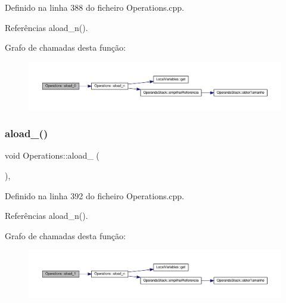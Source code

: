 Definido na linha 388 do ficheiro Operations.\+cpp.



Referências aload\+\_\+n().

Grafo de chamadas desta função\+:\nopagebreak
\begin{figure}[H]
\begin{center}
\leavevmode
\includegraphics[width=350pt]{classOperations_a9d821a16ef0681755717e8c4f740f6d0_cgraph}
\end{center}
\end{figure}
\mbox{\label{classOperations_a8291f2b716c1be7428d9b63a5225b52d}} 
\subsubsection{\texorpdfstring{aload\+\_()}{aload\_1()}}
{\footnotesize\ttfamily void Operations\+::aload\+\_ (\begin{DoxyParamCaption}{ }\end{DoxyParamCaption})\hspace{0.3cm}{\ttfamily [static]}, {\ttfamily [private]}}



Definido na linha 392 do ficheiro Operations.\+cpp.



Referências aload\+\_\+n().

Grafo de chamadas desta função\+:\nopagebreak
\begin{figure}[H]
\begin{center}
\leavevmode
\includegraphics[width=350pt]{classOperations_a8291f2b716c1be7428d9b63a5225b52d_cgraph}
\end{center}
\end{figure}
\mbox{\label{classOperations_abd58f463152d7f88b9fb2f133c6ca184}} 
